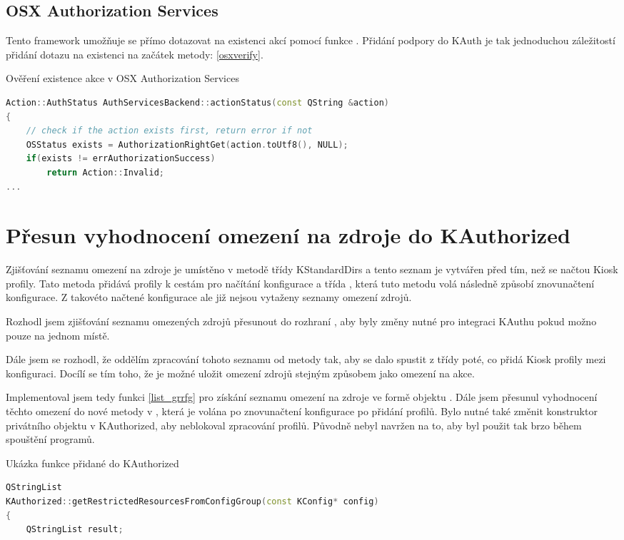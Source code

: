 {\subsection{OSX Authorization Services}
Tento framework umožňuje se přímo dotazovat na existenci akcí pomocí funkce . Přidání podpory do KAuth je tak jednoduchou záležitostí přidání dotazu na existenci na začátek metody: \ref{osxverify}.
\begin{mylisting}
\caption{Ověření existence akce v OSX Authorization Services}
\label{osxverify}
\begin{lstlisting}[language=C++]
Action::AuthStatus AuthServicesBackend::actionStatus(const QString &action)
{
    // check if the action exists first, return error if not
    OSStatus exists = AuthorizationRightGet(action.toUtf8(), NULL);
    if(exists != errAuthorizationSuccess)
        return Action::Invalid;
...
\end{lstlisting}
\end{mylisting}

\section{Přesun vyhodnocení omezení na zdroje do KAuthorized}
Zjišťování seznamu omezení na zdroje je umístěno v metodě  třídy KStandardDirs a tento seznam je vytvářen před tím, než se načtou Kiosk profily. Tato metoda přidává profily k cestám pro načítání konfigurace a třída , která tuto metodu volá následně způsobí znovunačtení konfigurace. Z takovéto načtené konfigurace ale již nejsou vytaženy seznamy omezení zdrojů.

Rozhodl jsem zjišťování seznamu omezených zdrojů přesunout do rozhraní , aby byly změny nutné pro integraci KAuthu pokud možno pouze na jednom místě.

Dále jsem se rozhodl, že oddělím zpracování tohoto seznamu od metody  tak, aby se dalo spustit z třídy  poté, co  přidá Kiosk profily mezi konfiguraci. Docílí se tím toho, že je možné uložit omezení zdrojů stejným způsobem jako omezení na akce.

Implementoval jsem tedy funkci \ref{list_grrfg} pro získání seznamu omezení na zdroje ve formě objektu . Dále jsem přesunul vyhodnocení těchto omezení do nové metody  v , která je volána po znovunačtení konfigurace po přidání profilů. Bylo nutné také změnit konstruktor privátního objektu v KAuthorized, aby neblokoval zpracování profilů. Původně nebyl navržen na to, aby byl použit tak brzo během spouštění programů.
\begin{mylisting}
\caption{Ukázka funkce přidané do KAuthorized}
\label{list_grrfg}
\begin{lstlisting}[language=C++]
QStringList
KAuthorized::getRestrictedResourcesFromConfigGroup(const KConfig* config)
{
    QStringList result;


\end{lstlisting}
\end{mylisting}}
